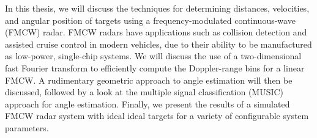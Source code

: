 In this thesis, we will discuss the
techniques for determining distances, velocities, and angular position of targets
using a frequency-modulated continuous-wave (FMCW) radar. FMCW radars have
applications such as collision detection and assisted
cruise control in modern vehicles, due to their ability to be manufactured as
low-power, single-chip systems. We will discuss the use of a two-dimensional
fast Fourier transform to efficiently compute the Doppler-range bins for a
linear FMCW. A rudimentary geometric approach to angle estimation will then be
discussed, followed by a look at the multiple signal classification (MUSIC)
approach for angle estimation. Finally, we present the results of a simulated
FMCW radar system with ideal ideal targets for a variety of configurable system
parameters.
